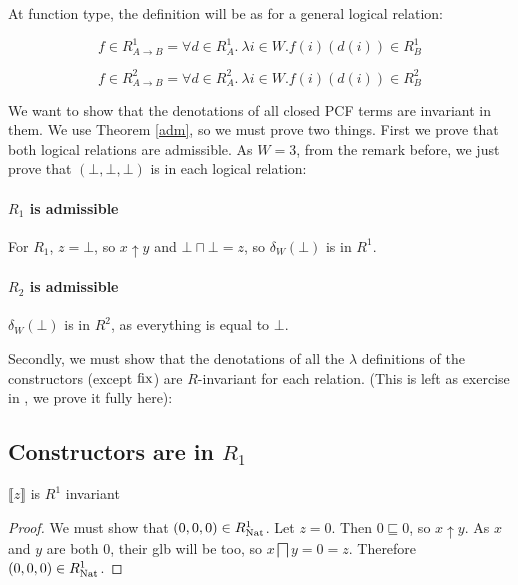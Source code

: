 At function type, the definition will be as for a general logical relation:

\[ f \in R_{A \to B}^1 = \forall d \in R_A^1. \ \lambda i \in W. f(i)(d(i)) \in R_B^1 \]

\[ f \in R_{A \to B}^2 = \forall d \in R_A^2. \ \lambda i \in W. f(i)(d(i)) \in R_B^2 \]

We want to show that the denotations of all closed PCF terms are invariant in them. We use Theorem \ref{adm}, so we must prove two things. First we prove that both logical relations are admissible. As $W = 3$, from the remark before, we just prove that $(\bot, \bot, \bot)$ is in each logical relation:


\paragraph{$R_1$ is admissible} For $R_1$, $z = \bot$, so $x \uparrow y$ and $\bot \sqcap \bot = z$, so $\delta_W(\bot)$ is in $R^1$.


\paragraph{$R_2$ is admissible}

$\delta_W(\bot)$ is in $R^2$, as everything is equal to $\bot$.


Secondly, we must show that the denotations of all the $\lambda$ definitions of the constructors (except $\operatorname{fix}$) are $R$-invariant for each relation. (This is left as exercise in \citep{Streicher06}, we prove it fully here):


\subsection{Constructors are in $R_1$}

\begin{lem}
$\llbracket z \rrbracket$ is $R^1$ invariant
\end{lem}

\vspace{0.25cm}

\begin{proof} We must show that $(0,0,0) \in R_{\operatorname{Nat}}^1$. Let $z = 0$. Then $0 \sqsubseteq 0$, so $x \uparrow y$. As $x$ and $y$ are both $0$, their glb will be too, so $x \bigsqcap y = 0 = z$. Therefore $(0,0,0) \in R_{\operatorname{Nat}}^1$.
\end{proof}

